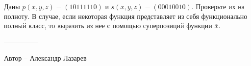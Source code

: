 \question
Даны $p(x, y, z) = (10111110)$ и $s(x, y, z) = (00010010)$. Проверьте их на полноту. В случае, если некоторая функция представляет из себя функционально полный класс, то выразить из нее с помощью суперпозиций функции $\overline{x}$.

---------------

Автор -- Александр Лазарев